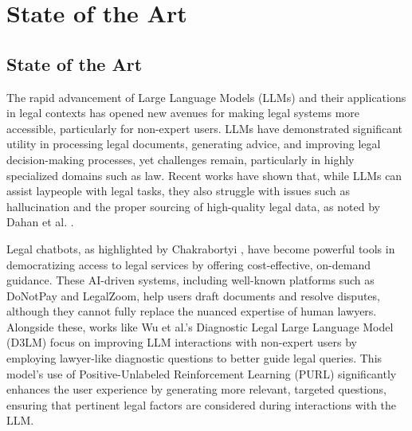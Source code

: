 \chapter{State of the Art}
\label{cha:sota}




\section{State of the Art}

The rapid advancement of Large Language Models (LLMs) and their applications 
in legal contexts has opened new avenues for making legal systems more accessible, 
particularly for non-expert users. LLMs have demonstrated significant utility in processing 
legal documents, generating advice, and improving legal decision-making processes, 
yet challenges remain, particularly in highly specialized domains such as law. 
Recent works have shown that, while LLMs can assist laypeople with legal tasks, 
they also struggle with issues such as hallucination and the proper sourcing of 
high-quality legal data, as noted by Dahan et al. \cite{dahan2023lawyers}.

Legal chatbots, as highlighted by Chakrabortyi \cite{chakraborty2023revolutionizing}, 
have become powerful tools in democratizing access to legal services by offering 
cost-effective, on-demand guidance. These AI-driven systems, including well-known 
platforms such as DoNotPay and LegalZoom, help users draft documents and resolve 
disputes, although they cannot fully replace the nuanced expertise of human lawyers. 
Alongside these, works like Wu et al.'s 
Diagnostic Legal Large Language Model (D3LM) \cite{wu2024knowledgeinfusedlegalwisdomnavigating} 
focus on improving LLM interactions with non-expert users by employing lawyer-like diagnostic 
questions to better guide legal queries. This model's use of Positive-Unlabeled Reinforcement 
Learning (PURL) significantly enhances the user experience by generating more relevant, 
targeted questions, ensuring that pertinent legal factors are considered during interactions with the LLM.

